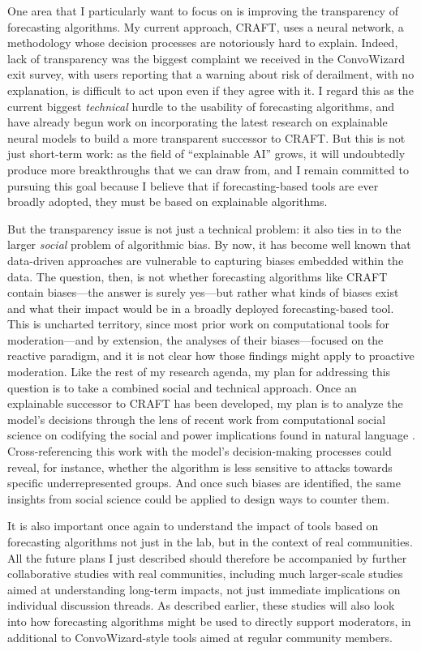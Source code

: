 \documentclass[11pt,letterpaper]{article}
\begin{document}
One area that I particularly want to focus on is improving the transparency of forecasting algorithms.
My current approach, CRAFT, uses a neural network, a methodology whose decision processes are notoriously hard to explain.
Indeed, lack of transparency was the biggest complaint we received in the ConvoWizard exit survey, with users reporting that a warning about risk of derailment, with no explanation, is difficult to act upon even if they agree with it.
I regard this as the current biggest \emph{technical} hurdle to the usability of forecasting algorithms, and have already begun work on incorporating the latest research on explainable neural models to build a more transparent successor to CRAFT.
But this is not just short-term work: as the field of ``explainable AI'' grows, it will undoubtedly produce more breakthroughs that we can draw from, and I remain committed to pursuing this goal because I believe that if forecasting-based tools are ever broadly adopted, they must be based on explainable algorithms.

But the transparency issue is not just a technical problem: it also ties in to the larger \emph{social} problem of algorithmic bias.
By now, it has become well known that data-driven approaches are vulnerable to capturing biases embedded within the data.
The question, then, is not whether forecasting algorithms like CRAFT contain biases---the answer is surely yes---but rather what kinds of biases exist and what their impact would be in a broadly deployed forecasting-based tool.
This is uncharted territory, since most prior work on computational tools for moderation---and by extension, the analyses of their biases---focused on the reactive paradigm, and it is not clear how those findings might apply to proactive moderation.
Like the rest of my research agenda, my plan for addressing this question is to take a combined social and technical approach.
Once an explainable successor to CRAFT has been developed, my plan is to analyze the model's decisions through the lens of recent work from computational social science on codifying the social and power implications found in natural language \cite{sap_social_2020}.
Cross-referencing this work with the model's decision-making processes could reveal, for instance, whether the algorithm is less sensitive to attacks towards specific underrepresented groups.
And once such biases are identified, the same insights from social science could be applied to design ways to counter them.

It is also important once again to understand the impact of tools based on forecasting algorithms not just in the lab, but in the context of real communities.
All the future plans I just described should therefore be accompanied by further collaborative studies with real communities, including much larger-scale studies aimed at understanding long-term impacts, not just immediate implications on individual discussion threads.
As described earlier, these studies will also look into how forecasting algorithms might be used to directly support moderators, in additional to ConvoWizard-style tools aimed at regular community members.
\end{document}

